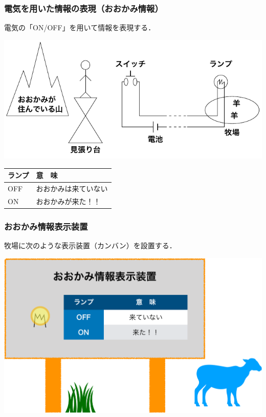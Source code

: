 \documentclass[handout]{beamer}        %
\begin{document}
\begin{frame}
  \frametitle{電気を用いた情報の表現（おおかみ情報）}
  電気の「ON/OFF」を用いて情報を表現する．
  \begin{center}
    \includegraphics[scale=0.8]{../Tikz/ookami.pdf}
  \end{center}
  \begin{center}
    \begin{tabular}{l | l}\hline\hline
      ランプ  &  意　味 \\\hline
      OFF     & おおかみは来ていない \\
      ON      & おおかみが来た！！
    \end{tabular}
  \end{center}
\end{frame}

\begin{frame}
  \frametitle{おおかみ情報表示装置}
  牧場に次のような表示装置（カンバン）を設置する．
  \vfill
  \begin{center}
    \includegraphics[scale=0.35]{Fig/display-crop.pdf}
    \vfill
  \end{center}
\end{frame}
\end{document}
